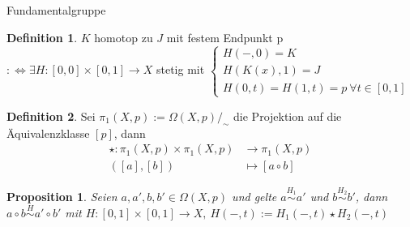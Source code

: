 \documentclass[a4paper,pagesizefontsize=12pt]{scrartcl}
\newtheorem*{prop*}{Proposition}
\theoremstyle{definition}
\newtheorem{defi}{Definition}
\theoremstyle{remark}
\begin{document}
\begin{section}{Fundamentalgruppe}
\begin{defi}
$K$ homotop zu $J$ mit festem Endpunkt p\\
$:\Leftrightarrow \exists H : [0,0] \times [0,1] \rightarrow X$ stetig mit $\left\{\begin{array}{l} 
H(-,0) = K \\
H(K(x),1)=J\\
H(0,t)=H(1,t)=p\ \forall t \in[0,1]
\end{array}\right.$
\end{defi}
\vspace{0.2cm}

\begin{defi}
Sei $\pi_1(X,p) := \Omega(X,p)/_{\sim}$ die Projektion auf die Äquivalenzklasse $[p] $, dann
\begin{displaymath}
\begin{array}{rl} 
\star : \pi_1(X,p) \times \pi_1(X,p) &\rightarrow \pi_1(X,p) \\
([a],[b]) & \mapsto [a\circ b]
\end{array}
\end{displaymath}
\end{defi}

\begin{prop*}
Seien $a,a',b,b' \in \Omega (X,p)$ und gelte $a\stackrel{H_{1}}{\sim} a'$ und $b\stackrel{H_{2}}{\sim} b'$, dann 
\\$a\circ b\stackrel{H}{\sim} a'\circ b'$ mit $H: [0,1]\times[0,1] \rightarrow X,\ H(-,t) := H_1(-,t)\star H_2(-,t)$
\end{prop*}
\vspace{0.2cm}


\end{section}
\end{document}

